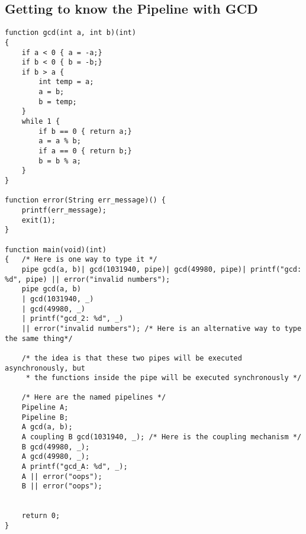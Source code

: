 \documentclass[./LRM_main.tex]{subfiles}
\begin{document}
\subsection{Getting to know the Pipeline with GCD}
\begin{lstlisting}
function gcd(int a, int b)(int)
{
	if a < 0 { a = -a;}
	if b < 0 { b = -b;}
	if b > a {
		int temp = a;
		a = b;
		b = temp;
	}
	while 1 {
		if b == 0 { return a;}
		a = a % b;
		if a == 0 { return b;}
		b = b % a;
	}
}

function error(String err_message)() {
	printf(err_message);
	exit(1);
}

function main(void)(int)
{	/* Here is one way to type it */
	pipe gcd(a, b)| gcd(1031940, pipe)| gcd(49980, pipe)| printf("gcd: %d", pipe) || error("invalid numbers");	
	pipe gcd(a, b)
	| gcd(1031940, _)
	| gcd(49980, _)
	| printf("gcd_2: %d", _)
	|| error("invalid numbers"); /* Here is an alternative way to type the same thing*/

	/* the idea is that these two pipes will be executed asynchronously, but
	 * the functions inside the pipe will be executed synchronously */
	
	/* Here are the named pipelines */
	Pipeline A;
	Pipeline B;
	A gcd(a, b);
	A coupling B gcd(1031940, _); /* Here is the coupling mechanism */
	B gcd(49980, _);
	A gcd(49980, _);
	A printf("gcd_A: %d", _);
	A || error("oops");
	B || error("oops");
	
	 
	return 0;
}

\end{lstlisting}
\end{document}
